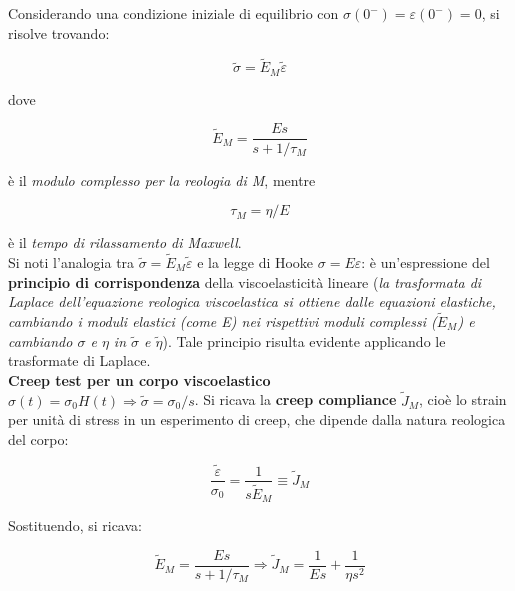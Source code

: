 \documentclass[a4paper,12pt]{book}
\begin{document}
\noindent Considerando una condizione iniziale di equilibrio con $\sigma(0^-) = \varepsilon (0^-) = 0$, si risolve trovando:

\begin{equation}
    \tilde{\sigma} = \tilde{E}_M \tilde{\varepsilon}
\end{equation}

\noindent
dove 

\begin{equation}
    \tilde{E}_M = \frac{Es}{s + 1/\tau_M}
\end{equation}

\noindent
è il \textit{modulo complesso per la reologia di M}, mentre

\begin{equation}
    \tau_M = \eta/E
\end{equation}

\noindent
è il \textit{tempo di rilassamento di Maxwell}.\\

\noindent
Si noti l'analogia tra $\tilde{\sigma} = \tilde{E}_M \tilde{\varepsilon}$ e la legge di Hooke $\sigma = E \varepsilon$: è un'espressione del \textbf{principio di corrispondenza} della viscoelasticità lineare (\textit{la trasformata di Laplace dell'equazione reologica viscoelastica si ottiene dalle equazioni elastiche, cambiando i moduli elastici (come E) nei rispettivi moduli complessi ($\tilde{E}_M$) e cambiando $\sigma$ e $\eta$ in $\tilde{\sigma}$ e $\tilde{\eta}$}).
Tale principio risulta evidente applicando le trasformate di Laplace.\\

\noindent
\textbf{Creep test per un corpo viscoelastico}\\

\noindent
$\sigma (t) = \sigma_0 H(t) \Longrightarrow \tilde{\sigma} = \sigma_0 / s$.
Si ricava la \textbf{creep compliance} $\tilde J_M$, cioè lo strain per unità di stress in un esperimento di creep, che dipende dalla natura reologica del corpo:

\begin{equation}
    \frac{\tilde{\varepsilon}}{\sigma_0} = \frac{1}{s \tilde{E}_M} \equiv \tilde{J}_M
\end{equation}

\noindent Sostituendo, si ricava:

\begin{equation}
    \tilde{E}_M = \frac{Es}{s + 1/\tau_M} \Longrightarrow \tilde{J}_M = \frac{1}{Es} + \frac{1}{\eta s^2}
\end{equation}
\end{document}
